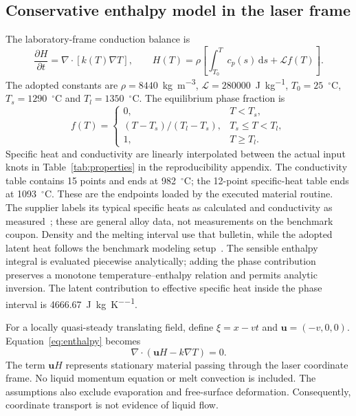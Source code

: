 \subsection{Conservative enthalpy model in the laser frame}
The laboratory-frame conduction balance is
\begin{equation}
 \frac{\partial H}{\partial t}=\nabla\cdot[k(T)\nabla T],\qquad
 H(T)=\rho\left[\int_{T_0}^{T}c_p(s)\,\mathrm ds+\mathcal L f(T)\right].
 \label{eq:enthalpy}
\end{equation}
The adopted constants are $\rho=8440$~\si{\kilogram\per\cubic\metre}, $\mathcal L=280000$~\si{\joule\per\kilogram}, $T_0=25$~$^\circ$C, $T_s=1290$~$^\circ$C and $T_l=1350$~$^\circ$C. The equilibrium phase fraction is
\begin{equation}
 f(T)=\begin{cases}
 0,&T<T_s,\\
 (T-T_s)/(T_l-T_s),&T_s\leq T<T_l,\\
 1,&T\geq T_l.
 \end{cases}
\end{equation}
Specific heat and conductivity are linearly interpolated between the actual input knots in Table~\ref{tab:properties} in the reproducibility appendix. The conductivity table contains 15 points and ends at 982~$^\circ$C; the 12-point specific-heat table ends at 1093~$^\circ$C. These are the endpoints loaded by the executed material routine. The supplier labels its typical specific heats as calculated and conductivity as measured~\cite{specialmetals625}; these are general alloy data, not measurements on the benchmark coupon. Density and the melting interval use that bulletin, while the adopted latent heat follows the benchmark modeling setup~\cite{kollmannsberger2019}. The sensible enthalpy integral is evaluated piecewise analytically; adding the phase contribution preserves a monotone temperature--enthalpy relation and permits analytic inversion. The latent contribution to effective specific heat inside the phase interval is 4666.67~\si{\joule\per\kilogram\per\kelvin}.

For a locally quasi-steady translating field, define $\xi=x-vt$ and $\bm u=(-v,0,0)$. Equation~\eqref{eq:enthalpy} becomes
\begin{equation}
 \nabla\cdot(\bm uH-k\nabla T)=0.
 \label{eq:frame}
\end{equation}
The term $\bm uH$ represents stationary material passing through the laser coordinate frame. No liquid momentum equation or melt convection is included. The assumptions also exclude evaporation and free-surface deformation. Consequently, coordinate transport is not evidence of liquid flow.

